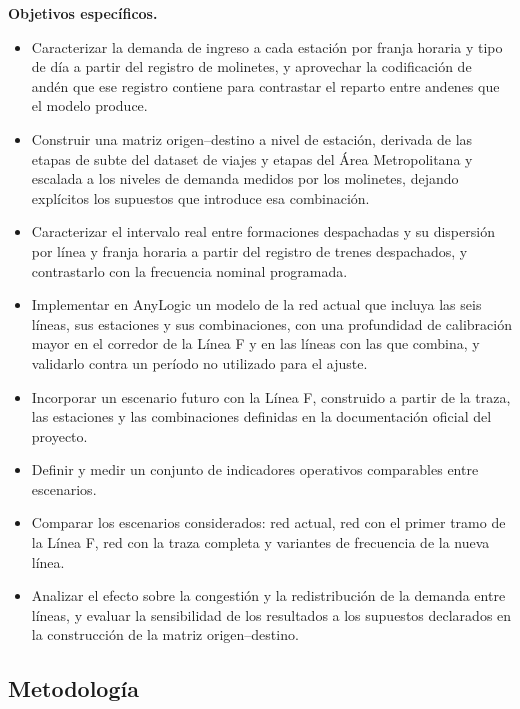 \documentclass{article}
\begin{document}
\textbf{Objetivos específicos.}
\begin{itemize}[leftmargin=1.4em,itemsep=0.15em,topsep=0.3em]
	\item Caracterizar la demanda de ingreso a cada estación por franja horaria y tipo de día a partir del
	      registro de molinetes, y aprovechar la codificación de andén que ese registro contiene para
	      contrastar el reparto entre andenes que el modelo produce.
	\item Construir una matriz origen--destino a nivel de estación, derivada de las etapas de subte del
	      dataset de viajes y etapas del Área Metropolitana y escalada a los niveles de demanda medidos por
	      los molinetes, dejando explícitos los supuestos que introduce esa combinación.
	\item Caracterizar el intervalo real entre formaciones despachadas y su dispersión por línea y franja
	      horaria a partir del registro de trenes despachados, y contrastarlo con la frecuencia nominal
	      programada.
	\item Implementar en AnyLogic un modelo de la red actual que incluya las seis líneas, sus estaciones y
	      sus combinaciones, con una profundidad de calibración mayor en el corredor de la Línea F y en las
	      líneas con las que combina, y validarlo contra un período no utilizado para el ajuste.
	\item Incorporar un escenario futuro con la Línea F, construido a partir de la traza, las estaciones y
	      las combinaciones definidas en la documentación oficial del proyecto.
	\item Definir y medir un conjunto de indicadores operativos comparables entre escenarios.
	\item Comparar los escenarios considerados: red actual, red con el primer tramo de la Línea F, red con
	      la traza completa y variantes de frecuencia de la nueva línea.
	\item Analizar el efecto sobre la congestión y la redistribución de la demanda entre líneas, y evaluar
	      la sensibilidad de los resultados a los supuestos declarados en la construcción de la matriz
	      origen--destino.
\end{itemize}

\subsection{Metodología}
\end{document}
